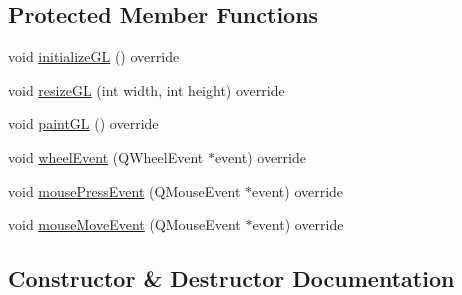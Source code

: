 \subsection*{Protected Member Functions}
\begin{DoxyCompactItemize}
\item 
void \hyperlink{classnMagWindows_1_1viewerWindow_a38e32a190bcd85e1a78fbf13c2e5bf2f}{initialize\+GL} () override
\item 
void \hyperlink{classnMagWindows_1_1viewerWindow_affcbcf6e86f76f64d4492372ebcc0aca}{resize\+GL} (int width, int height) override
\item 
void \hyperlink{classnMagWindows_1_1viewerWindow_a4dc51c39e4bb00f9622efb4a2683ce94}{paint\+GL} () override
\item 
void \hyperlink{classnMagWindows_1_1viewerWindow_a5ec1c19ffa3287dfece38f7db63c80ec}{wheel\+Event} (Q\+Wheel\+Event $\ast$event) override
\item 
void \hyperlink{classnMagWindows_1_1viewerWindow_ab10703ac3a707a6b813862255b606b51}{mouse\+Press\+Event} (Q\+Mouse\+Event $\ast$event) override
\item 
void \hyperlink{classnMagWindows_1_1viewerWindow_ae844f52b23024f772a8175aa1fa395d7}{mouse\+Move\+Event} (Q\+Mouse\+Event $\ast$event) override
\end{DoxyCompactItemize}


\subsection{Constructor \& Destructor Documentation}

